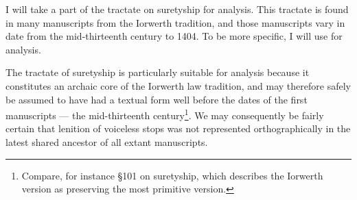 


I will take a part of the tractate on suretyship for analysis.
This tractate is found in many manuscripts from the Iorwerth tradition, and those manuscripts vary in date from the mid-thirteenth century to 1404.
To be more specific, I will use \textcite[\S\S58--65]{wiliam_llyfr_1960} for analysis.

The tractate of suretyship is particularly suitable for analysis because it constitutes an archaic core of the Iorwerth law tradition, and may therefore safely be assumed to have had a textual form well before the dates of the first manuscripts --- the mid-thirteenth century\footnote{Compare, for instance \S101 on suretyship, which \textcite[20]{stacey_archaic_1986} describes the Iorwerth version as preserving the most primitive version.}. We may consequently be fairly certain that lenition of voiceless stops was not represented orthographically in the latest shared ancestor of all extant manuscripts.

